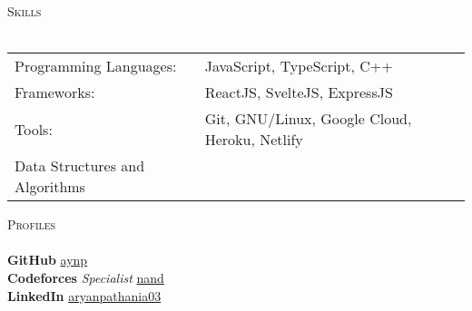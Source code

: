 \documentclass[a4paper]{article}
\newcommand{\lineunder} {
    \vspace*{-8pt} \\
    \hspace*{-18pt} \hrulefill \\
}
\newcommand{\header} [1] {
    {\hspace*{-18pt}\vspace*{6pt} \textsc{#1}}
    \vspace*{-6pt} \lineunder
}
\begin{document}
\header{Skills}
\begin{tabular}{ l l }
	Programming Languages:          & JavaScript, TypeScript, C++               \\
	Frameworks:                     & ReactJS, SvelteJS, ExpressJS              \\
	Tools:                          & Git, GNU/Linux, Google Cloud, Heroku, Netlify \\
	Data Structures and Algorithms &                                            \\
\end{tabular}
\vspace{2mm}

\header{Profiles}
{\textbf{GitHub}} \hfill \href{https://www.github.com/aynp}{aynp}\\
\vspace*{2mm}
{\textbf{Codeforces}} {\sl Specialist}  \hfill \href{https://codeforces.com/profile/nand}{nand}\\
\vspace*{2mm}
{\textbf{LinkedIn}} \hfill \href{https://www.linkedin.com/in/aryanpathania03/}{aryanpathania03}\\
\
\end{document}
